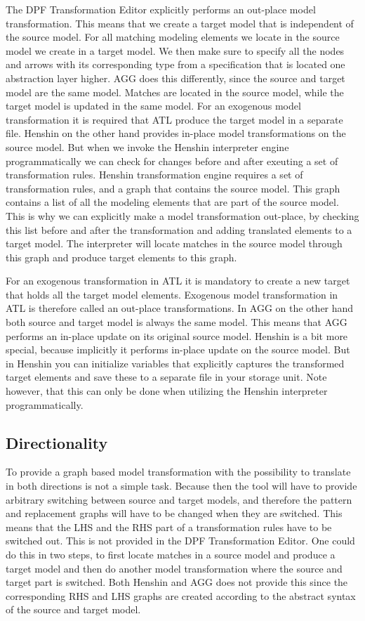 The DPF Transformation Editor explicitly performs an out-place model
transformation. This means that we create a target model that is independent of
the source model. For all matching modeling elements we locate in the source
model we create in a target model. We then make sure to specify all the nodes
and arrows with its corresponding type from a specification that is located one
abstraction layer higher. AGG does this differently, since the source and target
model are the same model. Matches are located in the source model, while the
target model is updated in the same model. For an exogenous model transformation
it is required that ATL produce the target model in a separate file. Henshin on
the other hand provides in-place model transformations on the source model. But
when we invoke the Henshin interpreter engine programmatically we can check for
changes before and after exeuting a set of transformation rules. Henshin
transformation engine requires a set of transformation rules, and a graph that
contains the source model. This graph contains a list of all the modeling
elements that are part of the source model. This is why we can explicitly make a
model transformation out-place, by checking this list before and after the
transformation and adding translated elements to a target model. The interpreter
will locate matches in the source model through this graph and produce target
elements to this graph. 

For an exogenous transformation in ATL it is mandatory to create a new target
that holds all the target model elements. Exogenous model transformation in ATL
is therefore called an out-place transformations. In AGG on the other hand both
source and target model is always the same model. This means that AGG performs an
in-place update on its original source model. Henshin is a bit more special,
because implicitly it performs in-place update on the source model. But in
Henshin you can initialize variables that explicitly captures the transformed
target elements and save these to a separate file in your storage unit. Note
however, that this can only be done when utilizing the Henshin interpreter
programmatically. 

\subsection{Directionality}

To provide a graph based model transformation with the possibility to translate
in both directions is not a simple task. Because then the tool will have to
provide arbitrary switching between source and target models, and therefore the
pattern and replacement graphs will have to be changed when they are switched.
This means that the LHS and the RHS part of a transformation rules have to be
switched out. This is not provided in the DPF Transformation Editor. One could do
this in two steps, to first locate matches in a source model and produce a
target model and then do another model transformation where the source and
target part is switched. Both Henshin and AGG does not provide this since the
corresponding RHS and LHS graphs are created according to the abstract syntax of
the source and target model. 

